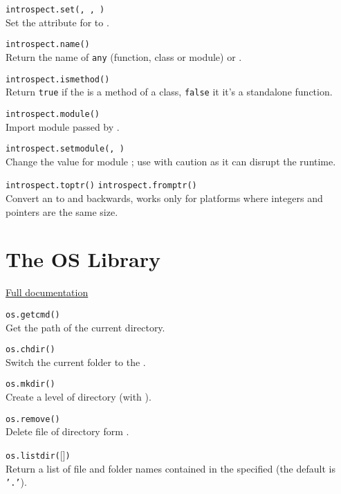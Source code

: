 \hangpar \texttt{introspect.set(}\texttt{, }\texttt{, }\texttt{)} \\
Set the attribute  for  to .

\hangpar \texttt{introspect.name(}\texttt{)} \\
Return the name of \texttt{any} (function, class or module) or .

\hangpar \texttt{introspect.ismethod(}\texttt{)} \\
Return \texttt{true} if the  is a method of a class, \texttt{false} it it's a standalone function.

\hangpar \texttt{introspect.module(}\texttt{)} \\
Import module passed by .

\hangpar \texttt{introspect.setmodule(}\texttt{, }\texttt{)} \\
Change the value for module ; use with caution as it can disrupt the runtime.

\hangpar \texttt{introspect.toptr(}\texttt{)}  \texttt{introspect.fromptr(}\texttt{)} \\
Convert an  to  and backwards, works only for platforms where integers and pointers are the same size.

\section*{The OS Library}

\hangpar \href{https://github.com/berry-lang/berry/wiki/Chapter-7\#module-os}{Full documentation}

\hangpar \texttt{os.getcmd()} \\
Get the path of the current directory.

\hangpar \texttt{os.chdir(}\texttt{)} \\
Switch the current folder to the .

\hangpar \texttt{os.mkdir(}\texttt{)} \\
Create a level of directory (with ).

\hangpar \texttt{os.remove(}\texttt{)} \\
Delete file of directory form .

\hangpar \texttt{os.listdir(}[]\texttt{)} \\
Return a list of file and folder names contained in the specified  (the default is \texttt{'.'}).

